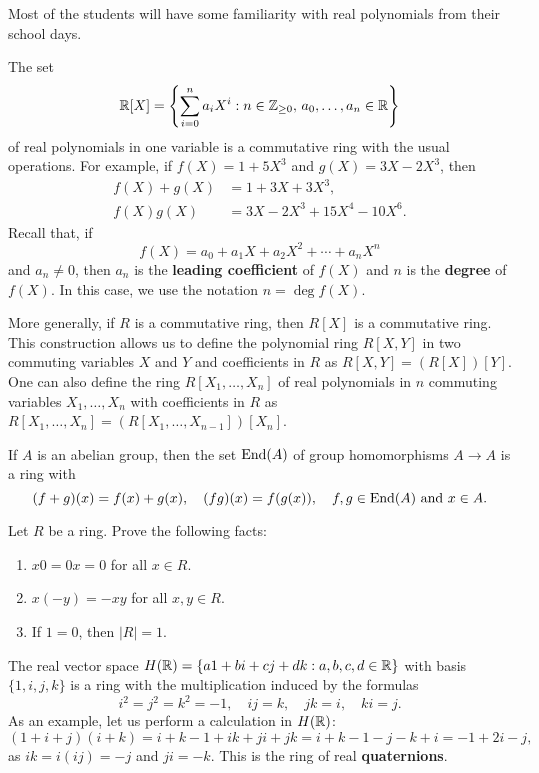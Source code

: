 Most of the students will have some familiarity with
real polynomials from their school days. 

\begin{example}
    The set  
    \[
		\mathbb{R}[X]=\left\{\sum_{i=0}^na_iX^i:n\in\mathbb{Z}_{\geq0},\,a_0,\dots,a_n\in \mathbb{R}\right\}
    \]
    of real polynomials in one variable 
    is a commutative ring with the usual operations.  
    For example, if $f(X)=1+5X^3$ and $g(X)=3X-2X^3$, then
    \begin{align*}
        f(X)+g(X) &= 1+3X+3X^3,\\
        f(X)g(X) &= 3X-2X^3+15X^4-10X^6.
    \end{align*}
    Recall that, if 
    \[
    f(X)=a_0+a_1X+a_2X^2+\cdots+a_nX^n
    \]
    and $a_n\ne0$, then $a_n$ is the \textbf{leading coefficient} of $f(X)$ and 
    $n$ is the \textbf{degree} of $f(X)$. In this case, we use the notation 
    $n=\deg f(X)$. 
\end{example}

More generally, if $R$ is a commutative ring, then $R[X]$ is a commutative ring. This construction
allows us to define 
the polynomial ring $R[X,Y]$ in two commuting variables $X$ and $Y$ and coefficients in $R$ as 
$R[X,Y]=(R[X])[Y]$. One can also define the ring  
$R[X_1,\dots,X_n]$ of real polynomials 
in $n$ commuting variables $X_1,\dots,X_n$ with coefficients in $R$ as 
$R[X_1,\dots,X_n]
=(R[X_1,\dots,X_{n-1}])[X_n]$.

\begin{example}
    If $A$ is an abelian group, then 
    the set 
    $\operatorname{End}(A)$ of group homomorphisms $A\to A$ is a ring with
    \[
    (f+g)(x)=f(x)+g(x),\quad
    (fg)(x)=f(g(x)),\quad f,g\in\operatorname{End}(A)\text{ and }x\in A.
    \]
\end{example}

\begin{exercise}
Let $R$ be a ring. Prove the following facts: 
\begin{enumerate}
    \item $x0=0x=0$ for all $x\in R$.
    \item $x(-y)=-xy$ for all $x,y\in R$.
    \item If $1=0$, then $|R|=1$. 
\end{enumerate}
\end{exercise}

\begin{example}
    The real vector space $H(\mathbb{R})=\{a1+bi+cj+dk:a,b,c,d\in\mathbb{R}\}$ with basis $\{1,i,j,k\}$ 
    is a ring with the multiplication induced by
    the formulas 
    \[
    i^2=j^2=k^2=-1,
    \quad ij=k,
    \quad jk=i,
    \quad ki=j.
    \]
    As an example, let us perform a calculation in $H(\mathbb{R})$: 
    \[
    (1+i+j)(i+k)=i+k-1+ik+ji+jk=i+k-1-j-k+i=-1+2i-j,
    \]
    as $ik=i(ij)=-j$ and $ji=-k$. This is the ring of real \textbf{quaternions}.
\end{example}

